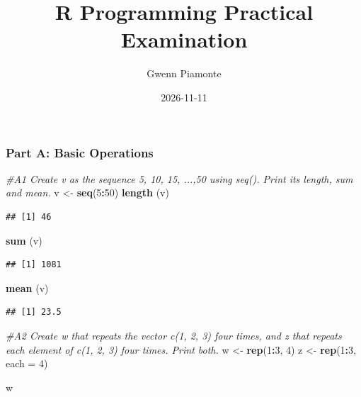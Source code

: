 \documentclass[
]{article}
\title{R Programming Practical Examination}
\author{Gwenn Piamonte}
\date{2026-11-11}
\newenvironment{Shaded}{\begin{snugshade}}{\end{snugshade}}
\newcommand{\AttributeTok}[1]{\textcolor[rgb]{0.13,0.29,0.53}{#1}}
\newcommand{\CommentTok}[1]{\textcolor[rgb]{0.56,0.35,0.01}{\textit{#1}}}
\newcommand{\DecValTok}[1]{\textcolor[rgb]{0.00,0.00,0.81}{#1}}
\newcommand{\FunctionTok}[1]{\textcolor[rgb]{0.13,0.29,0.53}{\textbf{#1}}}
\newcommand{\NormalTok}[1]{#1}
\newcommand{\OtherTok}[1]{\textcolor[rgb]{0.56,0.35,0.01}{#1}}
\newcommand{\SpecialCharTok}[1]{\textcolor[rgb]{0.81,0.36,0.00}{\textbf{#1}}}
\begin{document}
\maketitle

\subsubsection{Part A: Basic Operations}\label{part-a-basic-operations}

\begin{Shaded}
\begin{Highlighting}[]
\CommentTok{\#A1 Create v as the sequence 5, 10, 15, ...,50 using seq(). Print its length, sum and mean.}
\NormalTok{v }\OtherTok{\textless{}{-}} \FunctionTok{seq}\NormalTok{(}\DecValTok{5}\SpecialCharTok{:}\DecValTok{50}\NormalTok{)}
\FunctionTok{length}\NormalTok{ (v)}
\end{Highlighting}
\end{Shaded}

\begin{verbatim}
## [1] 46
\end{verbatim}

\begin{Shaded}
\begin{Highlighting}[]
\FunctionTok{sum}\NormalTok{ (v)}
\end{Highlighting}
\end{Shaded}

\begin{verbatim}
## [1] 1081
\end{verbatim}

\begin{Shaded}
\begin{Highlighting}[]
\FunctionTok{mean}\NormalTok{ (v)}
\end{Highlighting}
\end{Shaded}

\begin{verbatim}
## [1] 23.5
\end{verbatim}

\begin{Shaded}
\begin{Highlighting}[]
\CommentTok{\#A2 Create w that repeats the vector c(1, 2, 3) four times, and z that repeats each element of c(1, 2, 3) four times. Print both.}
\NormalTok{w }\OtherTok{\textless{}{-}} \FunctionTok{rep}\NormalTok{(}\DecValTok{1}\SpecialCharTok{:}\DecValTok{3}\NormalTok{, }\DecValTok{4}\NormalTok{)}
\NormalTok{z }\OtherTok{\textless{}{-}} \FunctionTok{rep}\NormalTok{(}\DecValTok{1}\SpecialCharTok{:}\DecValTok{3}\NormalTok{, }\AttributeTok{each =} \DecValTok{4}\NormalTok{)}

\NormalTok{w}
\end{Highlighting}
\end{Shaded}
\end{document}
